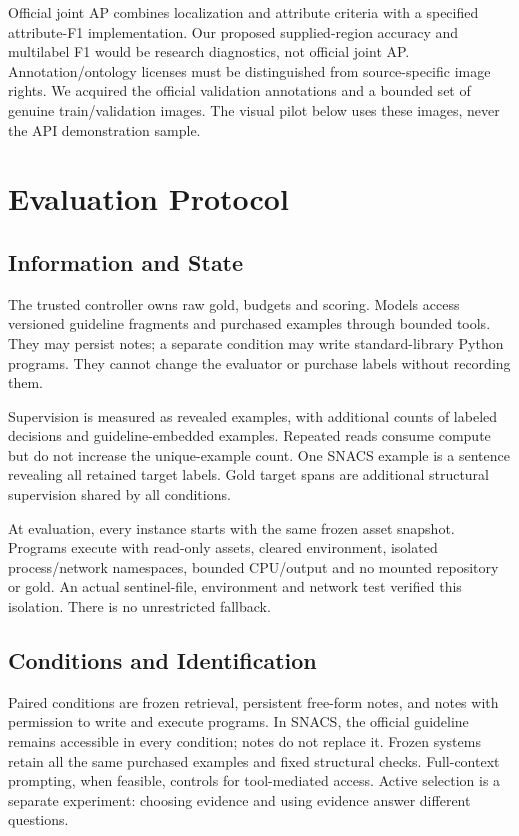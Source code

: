 \documentclass[11pt]{article}
\begin{document}
Official joint AP combines localization and attribute criteria with a specified attribute-F1 implementation. Our proposed supplied-region accuracy and multilabel F1 would be research diagnostics, not official joint AP. Annotation/ontology licenses must be distinguished from source-specific image rights. We acquired the official validation annotations and a bounded set of genuine train/validation images. The visual pilot below uses these images, never the API demonstration sample.

\section{Evaluation Protocol}
\subsection{Information and State}
The trusted controller owns raw gold, budgets and scoring. Models access versioned guideline fragments and purchased examples through bounded tools. They may persist notes; a separate condition may write standard-library Python programs. They cannot change the evaluator or purchase labels without recording them.

Supervision is measured as revealed examples, with additional counts of labeled decisions and guideline-embedded examples. Repeated reads consume compute but do not increase the unique-example count. One SNACS example is a sentence revealing all retained target labels. Gold target spans are additional structural supervision shared by all conditions.

At evaluation, every instance starts with the same frozen asset snapshot. Programs execute with read-only assets, cleared environment, isolated process/network namespaces, bounded CPU/output and no mounted repository or gold. An actual sentinel-file, environment and network test verified this isolation. There is no unrestricted fallback.

\subsection{Conditions and Identification}
Paired conditions are frozen retrieval, persistent free-form notes, and notes with permission to write and execute programs. In SNACS, the official guideline remains accessible in every condition; notes do not replace it. Frozen systems retain all the same purchased examples and fixed structural checks. Full-context prompting, when feasible, controls for tool-mediated access. Active selection is a separate experiment: choosing evidence and using evidence answer different questions.
\end{document}
